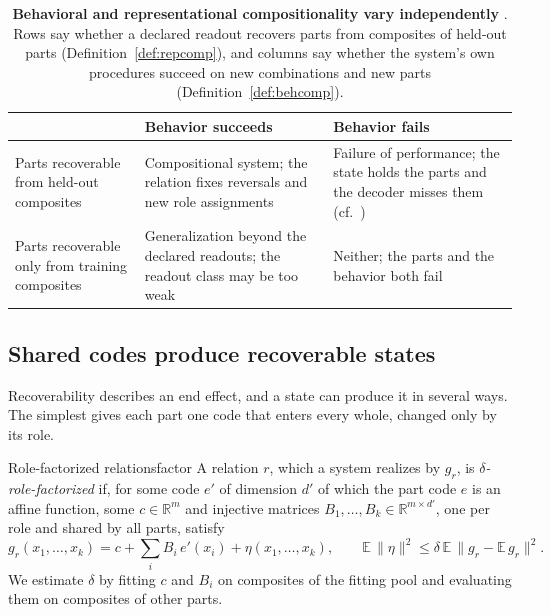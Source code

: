 \documentclass[10pt]{article}
\theoremstyle{plain}
\theoremstyle{remark}
\newcommand{\R}{\mathbb{R}}
\begin{document}
\begin{table}[tbp]
  \caption{\textbf{Behavioral and representational compositionality vary independently} \citep[cf.][]{vegner2025}. Rows say whether a declared readout recovers parts from composites of held-out parts (Definition~\ref{def:repcomp}), and columns say whether the system's own procedures succeed on new combinations and new parts (Definition~\ref{def:behcomp}).}
  \label{tab:twobytwo}
  \centering\small
  \begin{tabularx}{\linewidth}{@{}P{3.2cm}YY@{}}
    \toprule
    & Behavior succeeds & Behavior fails \\
    \midrule
    Parts recoverable from held-out composites & Compositional system; the relation fixes reversals and new role assignments & Failure of performance; the state holds the parts and the decoder misses them (cf.\ \citealt{montero2021,park2024hidden}) \\
    Parts recoverable only from training composites & Generalization beyond the declared readouts; the readout class may be too weak & Neither; the parts and the behavior both fail \\
    \bottomrule
  \end{tabularx}
\end{table}

\subsection{Shared codes produce recoverable states}
\label{sec:mechanics}

Recoverability describes an end effect, and a state can produce it in several ways. The simplest gives each part one code that enters every whole, changed only by its role.

\begin{defbox}{Role-factorized relations}{factor}
A relation $r$, which a system realizes by $g_r$, is \emph{$\delta$-role-factorized} if, for some code $e'$ of dimension $d'$ of which the part code $e$ is an affine function, some $c \in \R^m$ and injective matrices $B_1, \ldots, B_k \in \R^{m \times d'}$, one per role and shared by all parts, satisfy
\begin{equation}
  g_r(x_1, \ldots, x_k) = c + \textstyle\sum_{i} B_i\, e'(x_i) + \eta(x_1, \ldots, x_k), \qquad \mathbb{E}\,\lVert \eta \rVert^2 \le \delta\, \mathbb{E}\,\lVert g_r - \mathbb{E}\,g_r \rVert^2 .
  \label{eq:factor}
\end{equation}
We estimate $\delta$ by fitting $c$ and $B_i$ on composites of the fitting pool and evaluating them on composites of other parts.
\end{defbox}
\end{document}
